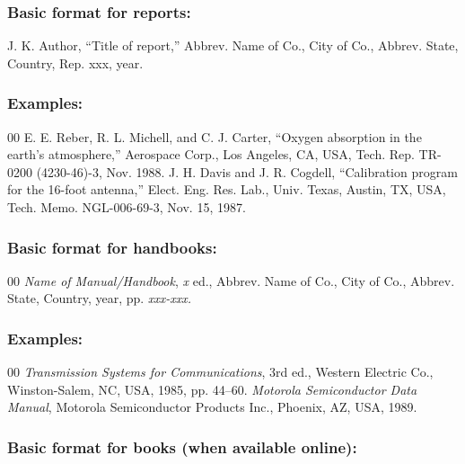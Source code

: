 \documentclass{IEEEoj}
\begin{document}
\subsubsection*{Basic format for reports:}

J. K. Author, ``Title of report,'' Abbrev. Name of Co., City of Co., Abbrev.
State, Country, Rep. {xxx}, year.

\subsubsection*{Examples:}

\begin{thebibliography}{00}
 E. E. Reber, R. L. Michell, and C. J. Carter, ``Oxygen absorption in the earth's atmosphere,'' Aerospace Corp., Los Angeles, CA, USA, Tech. Rep. TR-0200 (4230-46)-3, Nov. 1988.
 J. H. Davis and J. R. Cogdell, ``Calibration program for the 16-foot antenna,'' Elect. Eng. Res. Lab., Univ. Texas, Austin, TX, USA, Tech. Memo. NGL-006-69-3, Nov. 15, 1987.
\end{thebibliography}

\subsubsection*{Basic format for handbooks:}

\begin{thebibliography}{00}
 \textit{Name of Manual/Handbook}, \textit{x} ed., Abbrev. Name of Co., City of Co., Abbrev. State, Country, year, pp.
\textit{xxx-xxx.}
\end{thebibliography}

\subsubsection*{Examples:}

\begin{thebibliography}{00}
 \textit{Transmission Systems for Communications}, 3rd ed., Western Electric Co., Winston-Salem, NC, USA, 1985, pp. 44--60.
 \textit{Motorola Semiconductor Data Manual}, Motorola Semiconductor Products Inc., Phoenix, AZ, USA, 1989.
\end{thebibliography}

\subsubsection*{Basic format for books (when available online): }
\end{document}
